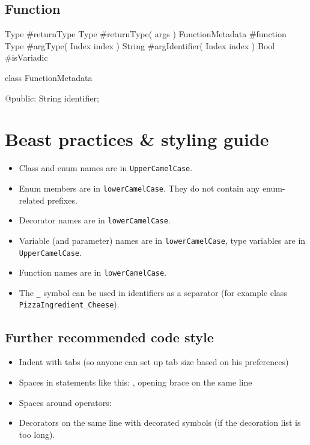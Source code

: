 \section{Function}
\begin{code}
Type #returnType
Type #returnType( args )
FunctionMetadata #function
Type #argType( Index index )
String #argIdentifier( Index index )
Bool #isVariadic

class FunctionMetadata {
	
@public:
	String identifier;
	
	
}
\end{code}

\chapter{Beast practices \& styling guide}

\begin{itemize}
	\item Class and enum names are in \verb|UpperCamelCase|.
	\item Enum members are in \verb|lowerCamelCase|. They do not contain any enum-related prefixes.
	\item Decorator names are in \verb|lowerCamelCase|.
	\item Variable (and parameter) names are in \verb|lowerCamelCase|, type variables are in\\\verb|UpperCamelCase|.
	\item Function names are in \verb|lowerCamelCase|.
	\item The \verb|_| symbol can be used in identifiers as a separator (for example class\\\verb|PizzaIngredient_Cheese|).
\end{itemize}

\section{Further recommended code style}
\begin{itemize}
	\item Indent with tabs (so anyone can set up tab size based on his preferences)
	\item Spaces in statements like this: , opening brace on the same line
	\item Spaces around operators: 
	\item Decorators on the same line with decorated symbols (if the decoration list is too long).
\end{itemize}

